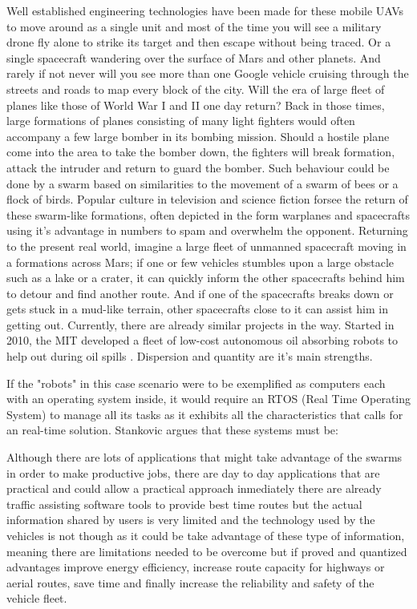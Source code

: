 \documentclass[journal]{IEEEtran}
\begin{document}
Well established engineering technologies have been made for these mobile UAVs to move around as a single unit and most of the time you will see a military drone fly alone to strike its target and then escape without being traced. Or a single spacecraft wandering over the surface of Mars and other planets. And rarely if not never will you see more than one Google vehicle cruising through the streets and roads to map every block of the city. Will the era of large fleet of planes like those of World War I and II one day return? Back in those times, large formations of planes consisting of many light fighters would often accompany a few large bomber in its bombing mission. Should a hostile plane come into the area to take the bomber down, the fighters will break formation, attack the intruder and return to guard the bomber. Such behaviour could be done by a swarm based on similarities to the movement of a swarm of bees or a flock of birds. Popular culture \cite{YS2} in television and science fiction forsee the return of these swarm-like formations, often depicted in the form warplanes and spacecrafts using it's advantage in numbers to spam and overwhelm the opponent. Returning to the present real world, imagine a large fleet of unmanned spacecraft moving in a formations across Mars; if one or few vehicles stumbles upon a large obstacle such as a lake or a crater, it can quickly inform the other spacecrafts behind him to detour and find another route. And if one of the spacecrafts breaks down or gets stuck in a mud-like terrain, other spacecrafts close to it can assist him in getting out. Currently, there are already similar projects in the way. Started in 2010, the MIT developed a fleet of low-cost autonomous oil absorbing robots to help out during oil spills \cite{YS3.5}\cite{YS3.6}. Dispersion and quantity are it's main strengths. 

If the "robots" in this case scenario were to be exemplified as computers each with an operating system inside, it would require an RTOS (Real Time Operating System) to manage all its tasks as it exhibits all the characteristics that calls for an real-time solution. Stankovic \cite{YS3} argues that these systems must be:

Although there are lots of applications that might take advantage of the swarms in order to make productive jobs, there are day to day applications that are practical and could allow a practical approach inmediately there are already traffic assisting software tools to provide best time routes but the actual information shared by users is very limited and the technology used by the vehicles is not though as it could be take advantage of these type of information, meaning there are limitations needed to be overcome but if proved and quantized advantages improve energy efficiency, increase route capacity for highways or aerial routes, save time and finally increase the reliability and safety of the vehicle fleet.
\end{document}
